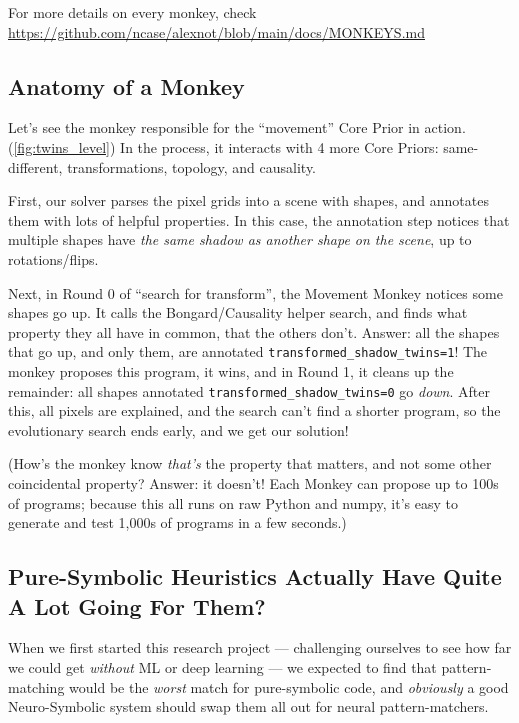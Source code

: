 \documentclass[11pt]{article}
\begin{document}
For more details on every monkey, check \url{https://github.com/ncase/alexnot/blob/main/docs/MONKEYS.md}

\subsection{Anatomy of a Monkey}

Let's see the monkey responsible for the ``movement'' Core Prior in action. (\autoref{fig:twins_level}) In the process, it interacts with 4 more Core Priors: same-different, transformations, topology, and causality.

First, our solver parses the pixel grids into a scene with shapes, and annotates them with lots of helpful properties. In this case, the annotation step notices that multiple shapes have \textit{the same shadow as another shape on the scene}, up to rotations/flips.

Next, in Round 0 of ``search for transform'', the Movement Monkey notices some shapes go up. It calls the Bongard/Causality helper search, and finds what property they all have in common, that the others don't. Answer: all the shapes that go up, and only them, are annotated \texttt{transformed\_shadow\_twins=1}! The monkey proposes this program, it wins, and in Round 1, it cleans up the remainder: all shapes annotated \texttt{transformed\_shadow\_twins=0} go \textit{down}. After this, all pixels are explained, and the search can't find a shorter program, so the evolutionary search ends early, and we get our solution!

(How's the monkey know \textit{that's} the property that matters, and not some other coincidental property? Answer: it doesn't! Each Monkey can propose up to 100s of programs; because this all runs on raw Python and numpy, it's easy to generate and test 1,000s of programs in a few seconds.)

\subsection{Pure-Symbolic Heuristics Actually Have Quite A Lot Going For Them?}

When we first started this research project — challenging ourselves to see how far we could get \textit{without} ML or deep learning — we expected to find that pattern-matching would be the \textit{worst} match for pure-symbolic code, and \textit{obviously} a good Neuro-Symbolic system should swap them all out for neural pattern-matchers.
\end{document}
